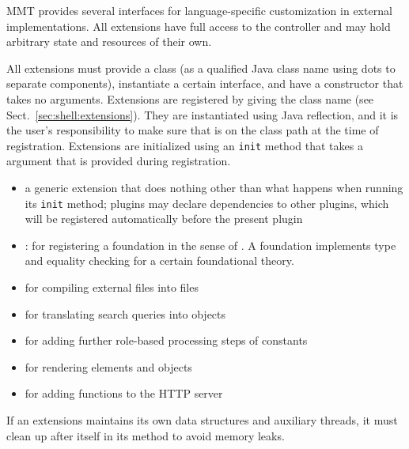MMT provides several interfaces for language-specific customization in external implementations.
All extensions have full access to the \mmt controller and may hold arbitrary state and resources of their own.

All extensions must provide a class  (as a qualified Java class name using dots to separate components), instantiate a certain interface, and have a constructor that takes no arguments.
Extensions are registered by giving the class name  (see Sect.~\ref{sec:shell:extensions}).
They are instantiated using Java reflection, and it is the user's responsibility to make sure that  is on the class path at the time of registration.
Extensions are initialized using an \texttt{init} method that takes a  argument that is provided during registration.


  \begin{itemize}
    \item {} a generic extension that does nothing other than what happens when running its \texttt{init} method; plugins may declare dependencies to other plugins, which will be registered automatically before the present plugin
    \item {}: for registering a foundation in the sense of \cite{RK:mmt:10}. A foundation implements type and equality checking for a certain foundational theory.
    \item {} for compiling external files into \mmt files
    \item {} for translating search queries into \mmt objects
    \item {} for adding further role-based processing steps of constants
    \item {} for rendering \mmt elements and objects
    \item {} for adding functions to the \mmt HTTP server
  \end{itemize}

If an extensions maintains its own data structures and auxiliary threads, it must clean up after itself in its  method to avoid memory leaks.

